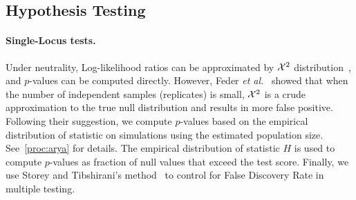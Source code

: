 
\subsection{Hypothesis Testing}
\paragraph{Single-Locus tests.}
Under neutrality, Log-likelihood ratios can be approximated by ${\cal X}^2$
distribution~\cite{williams2001weighing}, and $p$-values can be
computed directly. However, Feder \emph{et
  al.}~\cite{feder2014Identifying} showed that when the number of
independent samples (replicates) is small, ${\cal X}^2$ is a crude
approximation to the true null distribution and results in more false positive. 
Following their suggestion, we compute $p$-values based on the
empirical distribution of statistic on simulations using the estimated
population size. See~\ref{proc:arya} for details.  The empirical
distribution of statistic $H$ is used to compute $p$-values as
fraction of null values that exceed the test score.  Finally, we use
Storey and Tibshirani's method~\cite{storey2003statistical} to control
for False Discovery Rate in multiple testing.


